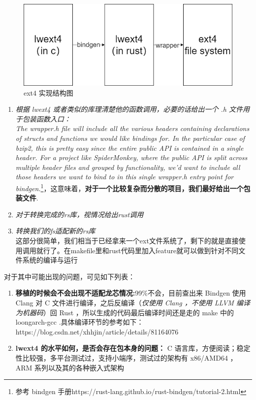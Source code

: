 \newpage

\begin{figure}[htbp]
    \centering
    \includegraphics[width=0.6\linewidth]{figs/plan-ext.png}
    \caption{ext4 实现结构图}
    \label{ext4-complexe}
\end{figure}

\begin{enumerate}
    \item \textit{根据 lwext4 或者类似的库理清楚他的函数调用，必要的话给出一个 .h 文件用于包装函数入口：} \\ \textit{The wrapper.h file will include all the various headers containing declarations of structs and functions we would like bindings for. In the particular case of bzip2, this is pretty easy since the entire public API is contained in a single header. For a project like SpiderMonkey, where the public API is split across multiple header files and grouped by functionality, we'd want to include all those headers we want to bind to in this single wrapper.h entry point for bindgen.}\footnote{参考 bindgen 手册https://rust-lang.github.io/rust-bindgen/tutorial-2.html}，这意味着，\textbf{对于一个比较复杂而分散的项目，我们最好给出一个包装文件}.
    \item \textit{对于转换完成的rs库，视情况给出rust调用}
    \item \textit{转换我们的fs适配新的rs库} \\ 这部分很简单，我们相当于已经拿来一个ext文件系统了，剩下的就是直接使用调用就行了。在makefile里和rust代码里加入feature就可以做到针对不同文件系统的编译与运行
\end{enumerate}

\vspace{1em}

对于其中可能出现的问题，可见如下列表：

\begin{enumerate}
    \item \textbf{移植的时候会不会出现不适配龙芯情况:}99\%不会，目前查出来 Bindgen 使用 Clang 对 C 文件进行编译，之后反编译（\textit{仅使用 Clang ，不使用 LLVM 编译为机器码}）回 Rust ，所以生成的代码最后编译时间还是走的 make 中的 loongarch-gcc .具体编译环节的参考如下：https://blog.csdn.net/xhhjin/article/details/81164076
    \item \textbf{lwext4 的水平如何，是否会存在包本身的问题：} C 语言库，方便阅读；稳定性比较强，多平台测试过，支持小端序，测试过的架构有 x86/AMD64 ， ARM 系列以及其的各种嵌入式架构
\end{enumerate}

